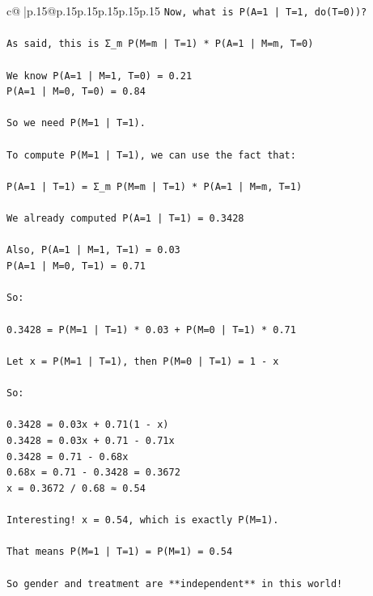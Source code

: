 \documentclass{article}
\begin{document}
{\begin{supertabular}{c@{$\;$}|p{.15\linewidth}@{}p{.15\linewidth}p{.15\linewidth}p{.15\linewidth}p{.15\linewidth}p{.15\linewidth}}
{{{\texttt{Now, what is P(A=1 | T=1, do(T=0))?} \\
\\ 
\texttt{As said, this is Σ\_m P(M=m | T=1) * P(A=1 | M=m, T=0)} \\
\\ 
\texttt{We know P(A=1 | M=1, T=0) = 0.21  } \\
\texttt{P(A=1 | M=0, T=0) = 0.84} \\
\\ 
\texttt{So we need P(M=1 | T=1).} \\
\\ 
\texttt{To compute P(M=1 | T=1), we can use the fact that:} \\
\\ 
\texttt{P(A=1 | T=1) = Σ\_m P(M=m | T=1) * P(A=1 | M=m, T=1)} \\
\\ 
\texttt{We already computed P(A=1 | T=1) = 0.3428} \\
\\ 
\texttt{Also, P(A=1 | M=1, T=1) = 0.03  } \\
\texttt{P(A=1 | M=0, T=1) = 0.71} \\
\\ 
\texttt{So:} \\
\\ 
\texttt{0.3428 = P(M=1 | T=1) * 0.03 + P(M=0 | T=1) * 0.71} \\
\\ 
\texttt{Let x = P(M=1 | T=1), then P(M=0 | T=1) = 1 {-} x} \\
\\ 
\texttt{So:} \\
\\ 
\texttt{0.3428 = 0.03x + 0.71(1 {-} x)  } \\
\texttt{0.3428 = 0.03x + 0.71 {-} 0.71x  } \\
\texttt{0.3428 = 0.71 {-} 0.68x  } \\
\texttt{0.68x = 0.71 {-} 0.3428 = 0.3672  } \\
\texttt{x = 0.3672 / 0.68 ≈ 0.54} \\
\\ 
\texttt{Interesting! x = 0.54, which is exactly P(M=1).} \\
\\ 
\texttt{That means P(M=1 | T=1) = P(M=1) = 0.54} \\
\\ 
\texttt{So gender and treatment are **independent** in this world!} \\
\\ 
}}}
\end{supertabular}}
\end{document}
